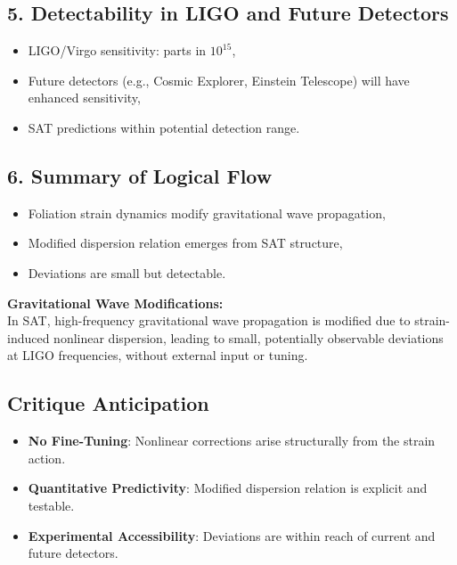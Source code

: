 \documentclass[12pt]{article}
\begin{document}
\subsection*{5. Detectability in LIGO and Future Detectors}
\begin{itemize}
    \item LIGO/Virgo sensitivity: parts in \(10^{15}\),
    \item Future detectors (e.g., Cosmic Explorer, Einstein Telescope) will have enhanced sensitivity,
    \item SAT predictions within potential detection range.
\end{itemize}

\subsection*{6. Summary of Logical Flow}
\begin{itemize}
    \item Foliation strain dynamics modify gravitational wave propagation,
    \item Modified dispersion relation emerges from SAT structure,
    \item Deviations are small but detectable.
\end{itemize}

\begin{mdframed}[linewidth=1pt, roundcorner=5pt, backgroundcolor=white]
\textbf{Gravitational Wave Modifications:} \\
In SAT, high-frequency gravitational wave propagation is modified due to strain-induced nonlinear dispersion, leading to small, potentially observable deviations at LIGO frequencies, without external input or tuning.
\end{mdframed}

\subsection*{Critique Anticipation}
\begin{itemize}
    \item \textbf{No Fine-Tuning}: Nonlinear corrections arise structurally from the strain action.
    \item \textbf{Quantitative Predictivity}: Modified dispersion relation is explicit and testable.
    \item \textbf{Experimental Accessibility}: Deviations are within reach of current and future detectors.
\end{itemize}
\end{document}
